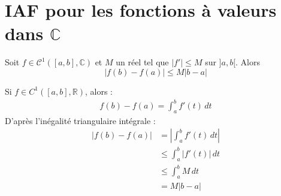 \documentclass[../main.tex]{subfiles}
\begin{document}
\section{IAF pour les fonctions à valeurs dans $\mathbb{C}$}
\begin{tcolorbox}[title=Théorème 18.45, title filled=false, colframe=orange, colback=orange!10!white]
    Soit $f\in \mathcal{C}^1([a, b], \mathbb{C})$ et $M$ un réel tel que $|f'| \leq M$ sur $]a, b[$. Alors
    $$|f(b) - f(a)| \leq M|b - a|$$
\end{tcolorbox}

\noindent Si $f\in C^1([a, b], \mathbb{R})$, alors : 
\begin{align*}
    f(b) - f(a) = \int_{a}^{b} f'(t) \, dt
\end{align*}
D'après l'inégalité triangulaire intégrale :
\begin{align*}
    |f(b) - f(a)| &= \left| \int_{a}^{b} f'(t) \, dt \right| \\
    &\leq \int_{a}^{b} |f'(t)| \, dt \\
    &\leq \int_{a}^{b} M \, dt \\
    &= M|b - a|
\end{align*}
\end{document}
